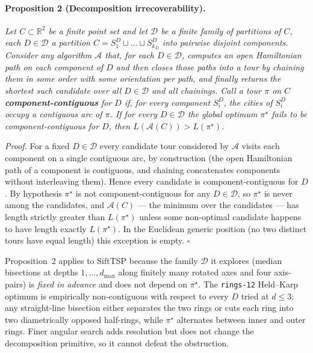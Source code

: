 \documentclass[11pt,a4paper]{article}
\begin{document}
\paragraph{Proposition 2 (Decomposition irrecoverability).}
\textit{Let $C \subset \mathbb{R}^2$ be a finite point set and let
$\mathcal{D}$ be a finite family of partitions of $C$, each
$D \in \mathcal{D}$ a partition $C = S_1^D \sqcup \dots \sqcup S_{k_D}^D$
into pairwise disjoint components. Consider any algorithm $\mathcal{A}$
that, for each $D \in \mathcal{D}$, computes an open Hamiltonian path
on each component of $D$ and then closes those paths into a tour by
chaining them in some order with some orientation per path, and
finally returns the shortest such candidate over all $D \in \mathcal{D}$
and all chainings. Call a tour $\pi$ on $C$ \textbf{component-contiguous}
for $D$ if, for every component $S_i^D$, the cities of $S_i^D$ occupy a
contiguous arc of $\pi$. If for every $D \in \mathcal{D}$ the global
optimum $\pi^{\star}$ fails to be component-contiguous for $D$, then
$L(\mathcal{A}(C)) > L(\pi^{\star})$.}

\textit{Proof.} For a fixed $D \in \mathcal{D}$ every candidate tour
considered by $\mathcal{A}$ visits each component on a single
contiguous arc, by construction (the open Hamiltonian path of a
component is contiguous, and chaining concatenates components without
interleaving them). Hence every candidate is component-contiguous for
$D$. By hypothesis $\pi^{\star}$ is not component-contiguous for any
$D \in \mathcal{D}$, so $\pi^{\star}$ is never among the candidates,
and $\mathcal{A}(C)$ --- the minimum over the candidates --- has length
strictly greater than $L(\pi^{\star})$ unless some non-optimal candidate
happens to have length exactly $L(\pi^{\star})$. In the Euclidean
generic position (no two distinct tours have equal length) this
exception is empty. $\square$

Proposition~2 applies to SiftTSP because the family $\mathcal{D}$ it
explores (median bisections at depths $1, \dots, d_{\max}$ along
finitely many rotated axes and four axis-pairs) is \emph{fixed in
advance} and does not depend on $\pi^{\star}$. The \texttt{rings-12}
Held--Karp optimum is empirically non-contiguous with respect to every
$D$ tried at $d \leq 3$: any straight-line bisection either separates
the two rings or cuts each ring into two diametrically opposed
half-rings, while $\pi^{\star}$ alternates between inner and outer
rings. Finer angular search adds resolution but does not change the
decomposition primitive, so it cannot defeat the obstruction.
\end{document}
